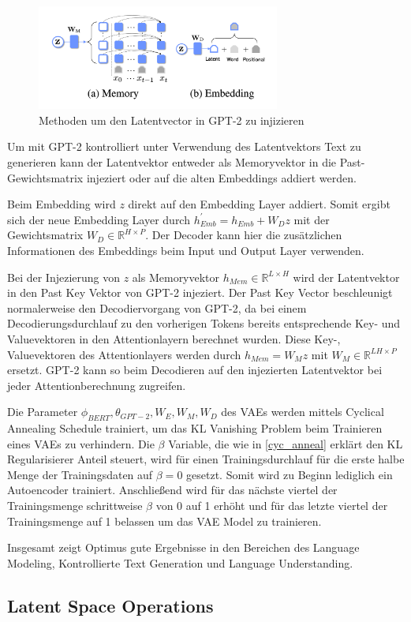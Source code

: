 \begin{figure}[h]
    \centering
    \includegraphics[width=8cm]{bilder/latent_optimus}
    \caption{Methoden um den Latentvector in GPT-2 zu injizieren}
    \label{latent_optimus}
\end{figure}

Um mit GPT-2 kontrolliert unter Verwendung des Latentvektors Text zu generieren kann der Latentvektor entweder als Memoryvektor in die Past-Gewichtsmatrix injeziert oder auf die alten Embeddings addiert werden.

Beim Embedding wird $z$ direkt auf den Embedding Layer addiert. Somit ergibt sich der neue Embedding Layer durch $h_{Emb}^{'} = h_{Emb} + W_D z$ mit der Gewichtsmatrix $W_D \in \mathbb{R}^{H \times P}$.
Der Decoder kann hier die zusätzlichen Informationen des Embeddings beim Input und Output Layer verwenden.

Bei der Injezierung von $z$ als Memoryvektor $h_{Mem} \in \mathbb{R}^{L\times H}$ wird der Latentvektor in den Past Key Vektor von GPT-2 injeziert. Der Past Key Vector beschleunigt normalerweise den Decodiervorgang von GPT-2, da bei einem Decodierungsdurchlauf zu den vorherigen Tokens bereits entsprechende Key- und Valuevektoren in den Attentionlayern berechnet wurden.
Diese Key-, Valuevektoren des Attentionlayers werden durch $h_{Mem} = W_M z$ mit $W_M \in \mathbb{R}^{LH \times P}$ ersetzt. GPT-2 kann so beim Decodieren auf den injezierten Latentvektor bei jeder Attentionberechnung zugreifen.

Die Parameter ${\phi_{BERT}, \theta_{GPT-2}, W_E,W_M,W_D}$ des VAEs werden mittels Cyclical Annealing Schedule \citep{DBLP:journals/corr/abs-1903-10145} trainiert, um das KL Vanishing Problem beim Trainieren eines VAEs zu verhindern.
Die $\beta$ Variable, die wie in \ref{cyc_anneal} erklärt den KL Regularisierer Anteil steuert, wird für einen Trainingsdurchlauf für die erste halbe Menge der Trainingsdaten auf $\beta = 0$ gesetzt. Somit wird zu Beginn lediglich ein Autoencoder trainiert. 
Anschließend wird für das nächste viertel der Trainingsmenge schrittweise $\beta$ von 0 auf 1 erhöht und für das letzte viertel der Trainingsmenge auf 1 belassen um das VAE Model zu trainieren.

Insgesamt zeigt Optimus gute Ergebnisse in den Bereichen des Language Modeling, Kontrollierte Text Generation und Language Understanding.




\subsection{Latent Space Operations}

\pagebreak
